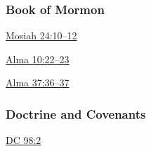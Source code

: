 				
				
		
	\subsubsection{Book of Mormon} %
		\label{PRAYER-BOM}
	
		
		\begin{compactdesc}
			\item[{\hyperref[MOSIAH-24-10]{Mosiah 24:10--12}}]
			\item[{\hyperref[ALMA-10-22]{Alma 10:22--23}}]
			\item[{\hyperref[ALMA-37-36]{Alma 37:36--37}}]
		\end{compactdesc}
		
	\subsubsection{Doctrine and Covenants} %
		\label{PRAYER-DC}
	
		
		\begin{compactdesc}
			\item[{\hyperref[DC98-2]{DC 98:2}}]
		\end{compactdesc}
		
	
